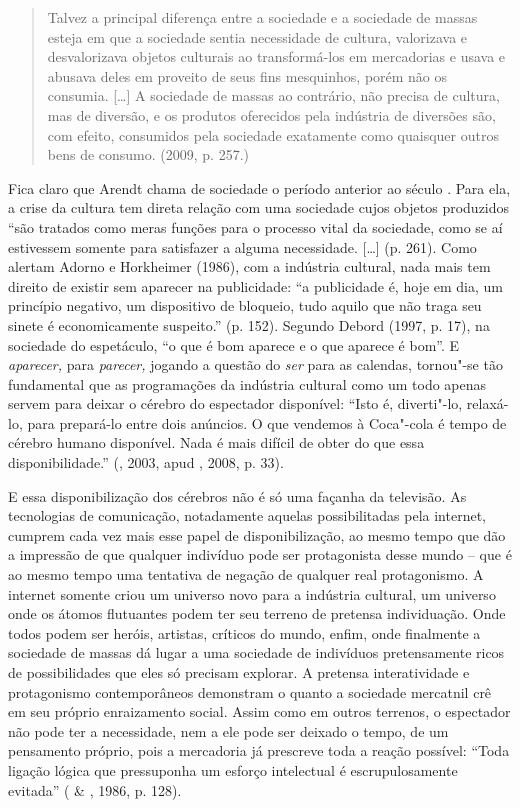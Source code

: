 \begin{quote}
Talvez a principal diferença entre a sociedade e a sociedade de massas
esteja em que a sociedade sentia necessidade de cultura, valorizava e
desvalorizava objetos culturais ao transformá-los em mercadorias e usava
e abusava deles em proveito de seus fins mesquinhos, porém não os
consumia. [\ldots{}] A sociedade de massas ao contrário, não precisa
de cultura, mas de diversão, e os produtos oferecidos pela indústria de
diversões são, com efeito, consumidos pela sociedade exatamente como
quaisquer outros bens de consumo. (2009, p. 257.)
\end{quote}

Fica claro que Arendt chama de sociedade o período anterior ao século
. Para ela, a crise da cultura tem direta relação com uma sociedade
cujos objetos produzidos ``são tratados como meras funções para o
processo vital da sociedade, como se aí estivessem somente para
satisfazer a alguma necessidade. [\ldots{}] (p. 261). Como alertam
Adorno e Horkheimer (1986), com a indústria cultural, nada mais tem
direito de existir sem aparecer na publicidade: ``a publicidade é, hoje
em dia, um princípio negativo, um dispositivo de bloqueio, tudo aquilo
que não traga seu sinete é economicamente suspeito.'' (p. 152). Segundo
Debord (1997, p. 17), na sociedade do espetáculo, ``o que é bom aparece
e o que aparece é bom''. E \emph{aparecer,} para \emph{parecer,}
jogando a questão do \emph{ser} para as calendas, tornou"-se tão
fundamental que as programações da indústria cultural como um todo
apenas servem para deixar o cérebro do espectador disponível: ``Isto é,
diverti"-lo, relaxá-lo, para prepará-lo entre dois anúncios. O que
vendemos à Coca"-cola é tempo de cérebro humano disponível. Nada é mais
difícil de obter do que essa disponibilidade.'' (, 2003, apud
, 2008, p. 33).

E essa disponibilização dos cérebros não é só uma façanha da televisão.
As tecnologias de comunicação, notadamente aquelas possibilitadas pela
internet, cumprem cada vez mais esse papel de disponibilização, ao mesmo
tempo que dão a impressão de que qualquer indivíduo pode ser
protagonista desse mundo -- que é ao mesmo tempo uma tentativa de
negação de qualquer real protagonismo. A internet somente criou um
universo novo para a indústria cultural, um universo onde os átomos
flutuantes podem ter seu terreno de pretensa individuação. Onde todos
podem ser heróis, artistas, críticos do mundo, enfim, onde finalmente a
sociedade de massas dá lugar a uma sociedade de indivíduos pretensamente
ricos de possibilidades que eles só precisam explorar. A pretensa
interatividade e protagonismo contemporâneos demonstram o quanto a
sociedade mercatnil crê em seu próprio enraizamento social. Assim como
em outros terrenos, o espectador não pode ter a necessidade, nem a ele
pode ser deixado o tempo, de um pensamento próprio, pois a mercadoria já
prescreve toda a reação possível: ``Toda ligação lógica que pressuponha
um esforço intelectual é escrupulosamente evitada'' ( \&
, 1986, p. 128).

